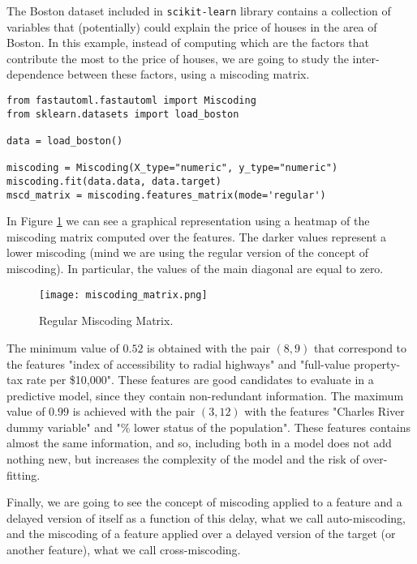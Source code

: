 \begin{example}
\label{example:miscoding_boston}
The Boston dataset included in \texttt{scikit-learn} library contains a collection of variables that (potentially) could explain the price of houses in the area of Boston. In this example, instead of computing which are the factors that contribute the most to the price of houses, we are going to study the inter-dependence between these factors, using a miscoding matrix.

\begin{sourcecode}
{\scriptsize \begin{verbatim}
from fastautoml.fastautoml import Miscoding
from sklearn.datasets import load_boston

data = load_boston()

miscoding = Miscoding(X_type="numeric", y_type="numeric")
miscoding.fit(data.data, data.target)
mscd_matrix = miscoding.features_matrix(mode='regular')
\end{verbatim}}
\end{sourcecode}

In Figure \ref{figure:miscoding_matrix} we can see a graphical representation using a heatmap of the miscoding matrix computed over the features. The darker values represent a lower miscoding (mind we are using the regular version of the concept of miscoding). In particular, the values of the main diagonal are equal to zero. 

\begin{figure}[h]
\centering
\texttt{[image: miscoding\_matrix.png]}
\caption{Regular Miscoding Matrix.}
\label{figure:miscoding_matrix}
\end{figure}

The minimum value of $0.52$ is obtained with the pair $(8, 9)$ that correspond to the features "index of accessibility to radial highways" and "full-value property-tax rate per \$10,000". These features are good candidates to evaluate in a predictive model, since they contain non-redundant information. The maximum value of $0.99$ is achieved with the pair $(3, 12)$ with the features "Charles River dummy variable" and "\% lower status of the population". These features contains almost the same information, and so, including both in a model does not add nothing new, but increases the complexity of the model and the risk of over-fitting.

\end{example}

Finally, we are going to see the concept of miscoding applied to a feature and a delayed version of itself as a function of this delay, what we call auto-miscoding, and the miscoding of a feature applied over a delayed version of the target (or another feature), what we call cross-miscoding.

